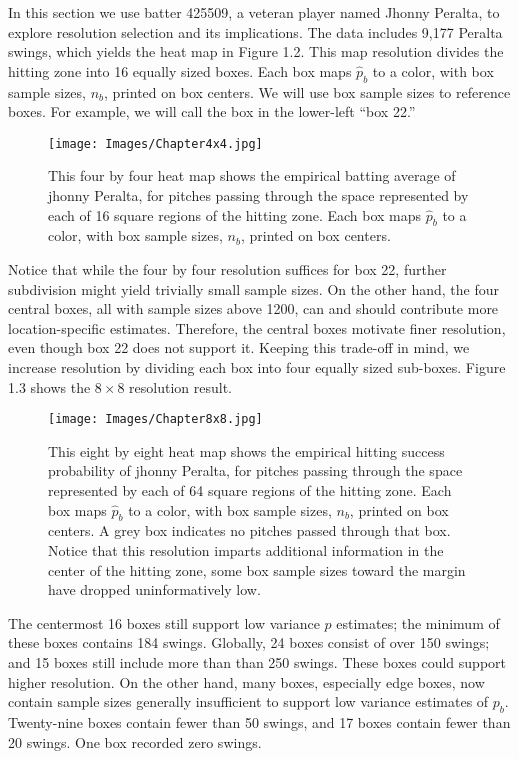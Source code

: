 In this section we use batter 425509, a veteran player named Jhonny Peralta, to explore resolution selection and its implications. The data includes 9,177 Peralta swings, which yields the heat map in Figure 1.2. This map resolution divides the hitting zone into 16 equally sized boxes. Each box maps $\hat{p}_{b}$ to a color, with box sample sizes, $n_{b}$, printed on box centers. We will use box sample sizes to reference boxes. For example, we will call the box in the lower-left ``box 22.'' 
        \begin{figure}[H]
      	\centering
      	\texttt{[image: Images/Chapter4x4.jpg]} 
      	\caption{This four by four heat map shows the empirical batting average of jhonny Peralta, for pitches passing through the space represented by each of 16 square regions of the hitting zone. Each box maps $\hat{p}_{b}$ to a color, with box sample sizes, $n_{b}$, printed on box centers.}
      	\end{figure} 

Notice that while the four by four resolution suffices for box 22, further subdivision might yield trivially small sample sizes. On the other hand, the four central boxes, all with sample sizes above 1200, can and should contribute more location-specific estimates. Therefore, the central boxes motivate finer resolution, even though box 22 does not support it. Keeping this trade-off in mind, we increase resolution by dividing each box into four equally sized sub-boxes. Figure 1.3 shows the $8 \times 8$ resolution result.
        \begin{figure}[H]
      	\centering
      	\texttt{[image: Images/Chapter8x8.jpg]} 
      	\caption{This eight by eight heat map shows the empirical hitting success probability of jhonny Peralta, for pitches passing through the space represented by each of 64 square regions of the hitting zone. Each box maps $\hat{p}_{b}$ to a color, with box sample sizes, $n_{b}$, printed on box centers. A grey box indicates no pitches passed through that box. Notice that this resolution imparts additional information in the center of the hitting zone, some box sample sizes toward the margin have dropped uninformatively low.}
      	\end{figure} 
The centermost 16 boxes still support low variance $p$ estimates; the minimum of these boxes contains 184 swings. Globally, 24 boxes consist of over 150 swings; and 15 boxes still include more than than 250 swings. These boxes could support higher resolution. On the other hand, many boxes, especially edge boxes, now contain sample sizes generally insufficient to support low variance estimates of $p_{b}$. Twenty-nine boxes contain fewer than 50 swings, and 17 boxes contain fewer than 20 swings. One box recorded zero swings.

